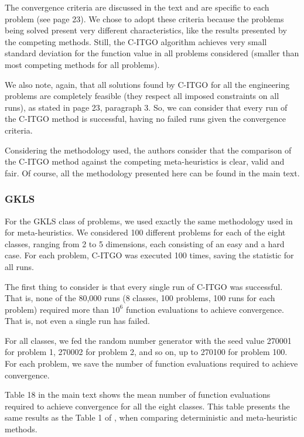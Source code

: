 \begin{revAns}
The convergence criteria are discussed in the text and are specific to each problem (see page 23). We chose to adopt these criteria because the problems being solved present very different characteristics, like the results presented by the competing methods. Still, the C-ITGO algorithm achieves very small standard deviation for the function value in all problems considered (smaller than most competing methods for all problems).

We also note, again, that all solutions found by C-ITGO for all the engineering problems are completely feasible (they respect all imposed constraints on all runs), as stated in page 23, paragraph 3. So, we can consider that every run of the C-ITGO method is successful, having no failed runs given the convergence criteria.

Considering the methodology used, the authors consider that the comparison of the C-ITGO method against the competing meta-heuristics is clear, valid and fair. Of course, all the methodology presented here can be found in the main text.



\subsubsection*{GKLS}

For the GKLS class of problems, we used exactly the same methodology used in \cite{NAT} for meta-heuristics. We considered 100 different problems for each of the eight classes, ranging from 2 to 5 dimensions, each consisting of an easy and a hard case. For each problem, C-ITGO was executed 100 times, saving the statistic for all runs.

The first thing to consider is that every single run of C-ITGO was successful. That is, none of the 80,000 runs (8 classes, 100 problems, 100 runs for each problem) required more than $10^6$ function evaluations to achieve convergence. That is, not even a single run has failed.

For all classes, we fed the random number generator with the seed value 270001 for problem 1, 270002 for problem 2, and so on, up to 270100 for problem 100. For each problem, we save the number of function evaluations required to achieve convergence.

Table 18 in the main text shows the mean number of function evaluations required to achieve convergence for all the eight classes. This table presents the same results as the Table 1 of \cite{NAT}, when comparing deterministic and meta-heuristic methods.


\end{revAns}
